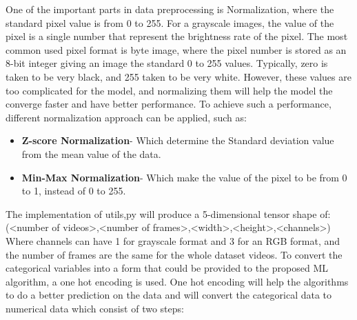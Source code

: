 One of the important parts in data preprocessing is Normalization, where the standard pixel value is from 0 to 255. For a grayscale images, the value of the pixel is a single number that represent the brightness rate of the pixel. The most common used pixel format is byte image, where the pixel number is stored as an 8-bit integer giving an image the standard 0 to 255 values. Typically, zero is taken to be very black, and 255 taken to be very white. However, these values are too complicated for the model, and normalizing them will help the model the converge faster and have better performance. To achieve such a performance, different normalization approach can be applied, such as:
\begin{itemize}
\item \textbf{Z-score Normalization}- Which determine the Standard deviation value from the mean value of the data.
\item \textbf{Min-Max Normalization}- Which make the value of the pixel to be from 0 to 1, instead of 0 to 255.
\end{itemize}
\hspace{5mm} The implementation of utils,py will produce a 5-dimensional tensor shape of:
(<number  of videos>,<number of frames>,<width>,<height>,<channels>)
Where channels can have 1 for grayscale format and 3 for an RGB format, and the number of frames are the same for the whole dataset videos.
To convert the categorical variables into a form that could be provided to the proposed ML algorithm, a one hot encoding is used. One hot encoding will help the algorithms to do a better prediction on the data and will convert the categorical data to numerical data which consist of two steps:
